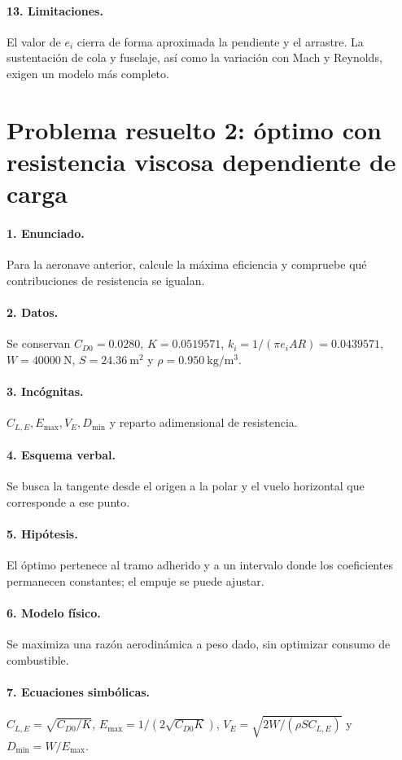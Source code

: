 \paragraph{13. Limitaciones.} El valor de $e_i$ cierra de forma aproximada la pendiente y el arrastre. La sustentación de cola y fuselaje, así como la variación con Mach y Reynolds, exigen un modelo más completo.

\section{Problema resuelto 2: óptimo con resistencia viscosa dependiente de carga}
\paragraph{1. Enunciado.} Para la aeronave anterior, calcule la máxima eficiencia y compruebe qué contribuciones de resistencia se igualan.
\paragraph{2. Datos.} Se conservan $C_{D0}=0.0280$, $K=0.0519571$, $k_i=1/(\pi e_i AR)=0.0439571$, $W=40000\ \mathrm N$, $S=24.36\ \mathrm{m^2}$ y $\rho=0.950\ \mathrm{kg/m^3}$.
\paragraph{3. Incógnitas.} $C_{L,E},E_{\max},V_E,D_{\min}$ y reparto adimensional de resistencia.
\paragraph{4. Esquema verbal.} Se busca la tangente desde el origen a la polar y el vuelo horizontal que corresponde a ese punto.
\paragraph{5. Hipótesis.} El óptimo pertenece al tramo adherido y a un intervalo donde los coeficientes permanecen constantes; el empuje se puede ajustar.
\paragraph{6. Modelo físico.} Se maximiza una razón aerodinámica a peso dado, sin optimizar consumo de combustible.
\paragraph{7. Ecuaciones simbólicas.} $C_{L,E}=\sqrt{C_{D0}/K}$, $E_{\max}=1/(2\sqrt{C_{D0}K})$, $V_E=\sqrt{2W/(\rho SC_{L,E})}$ y $D_{\min}=W/E_{\max}$.
